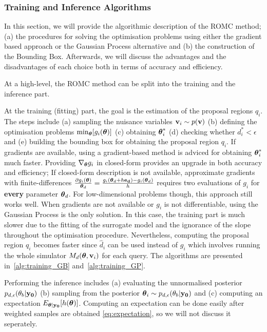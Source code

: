 \subsubsection{Training and Inference Algorithms}
\label{subsubsec:alg-training-inference}

In this section, we will provide the algorithmic description of the
ROMC method; (a) the procedures for solving the optimisation problems
using either the gradient based approach or the Gaussian Process
alternative and (b) the construction of the Bounding Box. Afterwards,
we will discuss the advantages and the disadvantages of each choice
both in terms of accuracy and efficiency.

\noindent
At a high-level, the ROMC method can be split into the training and
the inference part.

\noindent
At the training (fitting) part, the goal is the estimation of the
proposal regions $q_i$. The steps include (a) sampling the nuisance
variables $\mathbf{v}_i \sim p(\mathbf{v})$ (b) defining the optimisation problems
$\min_{\boldsymbol{\theta}} [g_i(\boldsymbol{\theta})]$ (c) obtaining $\boldsymbol{\theta}_i^*$ (d) checking
whether $d_i^* < \epsilon$ and (e) building the bounding box for
obtaining the proposal region $q_i$. If gradients are available, using
a gradient-based method is adviced for obtaining $\boldsymbol{\theta}_i^*$ much
faster.  Providing $\nabla_{\boldsymbol{\theta}} g_i$ in closed-form provides an
upgrade in both accuracy and efficiency; If closed-form description is
not available, approximate gradients with finite-differences
$\frac{\partial g_i(\boldsymbol{\theta})}{\boldsymbol{\theta}_d} = \frac{g_i(\boldsymbol{\theta}_d + h
  \mathbf{e_d}) - g_i(\boldsymbol{\theta}_d)}{h}$ requires two evaluations of $g_i$ for
\textbf{every} parameter $\boldsymbol{\theta}_d$. For low-dimensional problems
though, this approach still works well. When gradients are not
available or $g_i$ is not differentiable, using the Gaussian Process
is the only solution. In this case, the training part is much slower
due to the fitting of the surrogate model and the ignorance of the
slope throughout the optimisation procedure. Nevertheless, computing
the proposal region $q_i$ becomes faster since $\hat{d}_i$ can be used
instead of $g_i$ which involves running the whole simulator
$M_d(\boldsymbol{\theta}, \mathbf{v}_i)$ for each query. The algorithms are presented
in~\ref{alg:training_GB} and~\ref{alg:training_GP}.

\noindent
Performing the inference includes (a) evaluating the unnormalised
posterior $p_{d, \epsilon}(\theta_b|\mathbf{y_0})$ (b) sampling from the
posterior $ \boldsymbol{\theta}_i \sim p_{d, \epsilon}(\theta_b|\mathbf{y_0})$ and (c)
computing an expectation $E_{\boldsymbol{\theta}|\mathbf{y_0}}[h(\boldsymbol{\theta})]$.  Computing
an expectation can be done easily after weighted samples are obtained
\ref{eq:expectation}, so we will not discuss it seperately.

